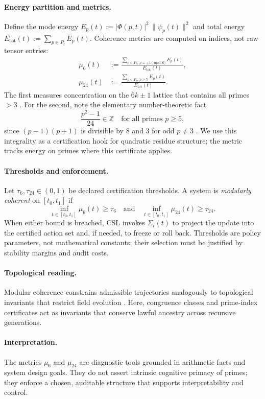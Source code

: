 \documentclass[12pt]{amsart}
\theoremstyle{plain}
\begin{document}
\paragraph{Energy partition and metrics.}
Define the mode energy $E_p(t):=|\Phi(p,t)|^2\,\|\psi_p(t)\|^2$ and total energy $E_{\mathrm{tot}}(t):=\sum_{p\in P_t}E_p(t)$. Coherence metrics are computed on indices, not raw tensor entries:
\begin{align*}
\mu_{6}(t)&:=\frac{\sum_{p\in P_t,\;p\equiv \pm1\!\!\!\!\pmod{6}} E_p(t)}{E_{\mathrm{tot}}(t)},\\
\mu_{24}(t)&:=\frac{\sum_{p\in P_t,\;p\ge 5} E_p(t)}{E_{\mathrm{tot}}(t)}.
\end{align*}
The first measures concentration on the $6k\pm1$ lattice that contains all primes $>3$ \cite{zidek2025spiral}. For the second, note the elementary number-theoretic fact
\[
\frac{p^{2}-1}{24}\in\mathbb{Z}\quad\text{for all primes }p\ge 5,
\]
since $(p-1)(p+1)$ is divisible by $8$ and $3$ for odd $p\not=3$ \cite[Ch.\,5]{hardy2008introduction}. We use this integrality as a certification hook for quadratic residue structure; the metric tracks energy on primes where this certificate applies.

\paragraph{Thresholds and enforcement.}
Let $\tau_6,\tau_{24}\in(0,1)$ be declared certification thresholds. A system is \emph{modularly coherent} on $[t_0,t_1]$ if
\[
\inf_{t\in[t_0,t_1]}\mu_6(t)\ge \tau_6
\quad\text{and}\quad
\inf_{t\in[t_0,t_1]}\mu_{24}(t)\ge \tau_{24}.
\]
When either bound is breached, CSL invokes $\Sigma_i(t)$ to project the update into the certified action set and, if needed, to freeze or roll back. Thresholds are policy parameters, not mathematical constants; their selection must be justified by stability margins and audit costs.

\paragraph{Topological reading.}
Modular coherence constrains admissible trajectories analogously to topological invariants that restrict field evolution \cite{nash1983topology}. Here, congruence classes and prime-index certificates act as invariants that conserve lawful ancestry across recursive generations.

\paragraph{Interpretation.}
The metrics $\mu_6$ and $\mu_{24}$ are diagnostic tools grounded in arithmetic facts and system design goals. They do not assert intrinsic cognitive primacy of primes; they enforce a chosen, auditable structure that supports interpretability and control.
\end{document}
